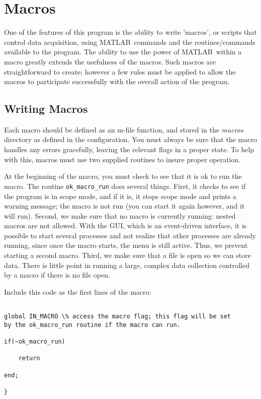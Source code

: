 \documentclass[11pt, letterpaper, titlepage]{paper}
\newcommand{\ml}{\textsf{MATLAB}}
\begin{document}
\section{Macros}

One of the features of this program is the ability to write 
'macros', or scripts that control data acquisition, using \ml\ 
commands and the routines/commands available to the program. The 
ability to use the power of \ml\ within a macro greatly extends 
the usefulness of the macros. Such macros are straightforward to 
create; however a few rules must be applied to allow the macros to 
participate successfully with the overall action of the program.

\subsection{Writing Macros}
 Each macro should be defined as an m-file function, and 
stored in the \textsl{macros} directory as defined in the 
configuration. You must always be sure that the macro handles any 
errors gracefully, leaving the relevant flags in a proper state. 
To help with this, macros must use two supplied routines to insure 
proper operation.

At the beginning of the macro, you must check to see that it is ok 
to run the macro. The routine \texttt{ok\_macro\_run} does several 
things. First, it checks to see if the program is in scope mode, 
and if it is, it stops scope mode and prints a warning message; 
the macro is not run (you can start it again however, and it will 
run). Second, we make sure that no macro is currently running: 
nested macros are not allowed. With the GUI, which is an 
event-driven interface, it is possible to start several processes 
and not realize that other processes are already running, since 
once the macro starts, the menu is still active. Thus, we prevent 
starting a second macro. Third, we make sure that a file is open 
so we can store data. There is little point in running a large, 
complex data collection controlled by a macro if there is no file 
open.

Include this code as the first lines of the macro:

\begin{verbatim}

global IN_MACRO \% access the macro flag; this flag will be set 
by the ok_macro_run routine if the macro can run.
 
if(~ok_macro_run)

    return

end;

} \end{verbatim}
\end{document}
